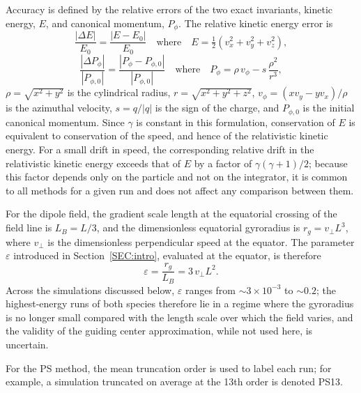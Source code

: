 \documentclass[draft]{agujournal2019}
\begin{document}
Accuracy is defined by the relative errors of the two exact invariants, kinetic energy, $E$, and canonical momentum, $P_{\phi}$. The relative kinetic energy error is
        \begin{equation*}
            \frac{|\Delta E|}{E_0}=\frac{|E-E_0|}{E_0}
            \quad\mbox{where}\quad
            E = \tfrac{1}{2}\left(v_x^2+v_y^2+v_z^2\right),
        \end{equation*}
        \begin{equation*}
            \frac{|\Delta P_{\phi}|}{|P_{\phi,0}|}=\frac{|P_\phi-P_{\phi,0}|}{|P_{\phi,0}|}
            \quad\mbox{where}\quad
            P_\phi = \rho\, v_\phi - s\,\frac{\rho^2}{r^3},
        \end{equation*}
$\rho = \sqrt{x^2 + y^2}$ is the cylindrical radius, $r = \sqrt{x^2 + y^2 + z^2}$, $v_\phi = (x v_y - y v_x)/\rho$ is the azimuthal velocity, $s = q/|q|$ is the sign of the charge, and $P_{\phi,0}$ is the initial canonical momentum. Since $\gamma$ is constant in this formulation, conservation of $E$ is equivalent to conservation of the speed, and hence of the relativistic kinetic energy. For a small drift in speed, the corresponding relative drift in the relativistic kinetic energy exceeds that of $E$ by a factor of $\gamma(\gamma+1)/2$; because this factor depends only on the particle and not on the integrator, it is common to all methods for a given run and does not affect any comparison between them.

For the dipole field, the gradient scale length at the equatorial crossing of the field line is $L_B = L/3$, and the dimensionless equatorial gyroradius is $r_g = v_{\perp} L^{3}$, where $v_{\perp}$ is the dimensionless perpendicular speed at the equator. The parameter $\varepsilon$ introduced in Section~\ref{SEC:intro}, evaluated at the equator, is therefore
        \begin{equation*}
            \varepsilon = \frac{r_g}{L_B} = 3\, v_{\perp} L^{2}.
        \end{equation*}
Across the simulations discussed below, $\varepsilon$ ranges from ${\sim}3\times10^{-3}$ to ${\sim}0.2$; the highest-energy runs of both species therefore lie in a regime where the gyroradius is no longer small compared with the length scale over which the field varies, and the validity of the guiding center approximation, while not used here, is uncertain.

For the PS method, the mean truncation order is used to label each run; for example, a simulation truncated on average at the 13th order is denoted PS13.
\end{document}
